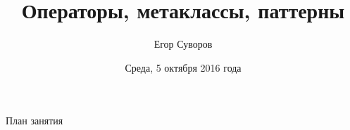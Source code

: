\documentclass[utf8,xcolor=table]{beamer}
\title{Операторы, метаклассы, паттерны}
\author{Егор Суворов}
\institute[СПб АУ]{Курс <<Парадигмы и языки программирования>>, подгруппа 3}
\date[05.10.2016]{Среда, 5 октября 2016 года}
\begin{document}
\begin{frame}
\titlepage
\end{frame}

\begin{frame}{План занятия}
	\tableofcontents
\end{frame}










\end{document}

